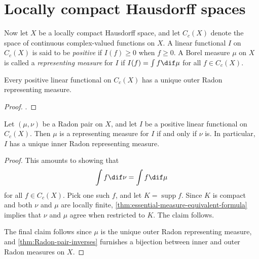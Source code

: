 \documentclass[article, a4paper, 11pt, oneside]{memoir}
\numberwithin{equation}{chapter}
\DeclareMathOperator{\supp}{supp}
\begin{document}
\section{Locally compact Hausdorff spaces}

Now let $X$ be a locally compact Hausdorff space, and let $C_c(X)$ denote the space of continuous complex-valued functions on $X$. A linear functional $I$ on $C_c(X)$ is said to be \emph{positive} if $I(f) \geq 0$ when $f \geq 0$. A Borel measure $\mu$ on $X$ is called a \emph{representing measure} for $I$ if $I(f) = \int f \dif\mu$ for all $f \in C_c(X)$.

\begin{theorem}
    Every positive linear functional on $C_c(X)$ has a unique outer Radon representing measure.
\end{theorem}

\begin{proof}
    \textcite[Theorem~7.2]{folland2007}.
\end{proof}

\begin{proposition}
    Let $(\mu,\nu)$ be a Radon pair on $X$, and let $I$ be a positive linear functional on $C_c(X)$. Then $\mu$ is a representing measure for $I$ if and only if $\nu$ is. In particular, $I$ has a unique inner Radon representing measure.
\end{proposition}

\begin{proof}
    This amounts to showing that
    \begin{equation*}
        \int f \dif \nu = \int f \dif \mu
    \end{equation*}
    for all $f \in C_c(X)$. Pick one such $f$, and let $K = \supp f$. Since $K$ is compact and both $\nu$ and $\mu$ are locally finite, \cref{thm:essential-measure-equivalent-formula} implies that $\nu$ and $\mu$ agree when restricted to $K$. The claim follows.

    The final claim follows since $\mu$ is the unique outer Radon representing measure, and \cref{thm:Radon-pair-inverses} furnishes a bijection between inner and outer Radon measures on $X$. %
\end{proof}


\nocite{*}

\printbibliography
\end{document}

